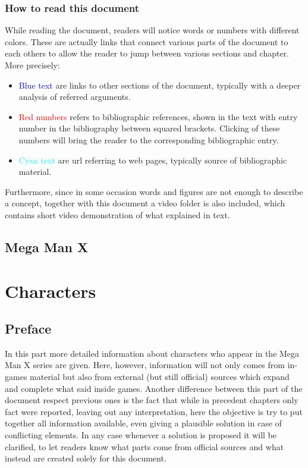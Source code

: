 \documentclass[openany]{report}
\begin{document}
	\section*{How to read this document}
	While reading the document, readers will notice words or numbers with different colors. These are actually links that connect various parts of the document to each others to allow the reader to jump between various sections and chapter. More precisely:
	\begin{itemize}
		\item \textcolor{blue}{Blue text} are links to other sections of the document, typically with a deeper analysis of referred arguments.
		\item \textcolor{red}{Red numbers} refers to bibliographic references, shown in the text with entry number in the bibliography between squared brackets. Clicking of these numbers will bring the reader to the corresponding bibliographic entry.
		\item \textcolor{cyan}{Cyan text} are url referring to web pages, typically source of bibliographic material.
	\end{itemize}
	
	Furthermore, since in some occasion words and figures are not enough to describe a concept, together with this document a video folder is also included, which contains short video demonstration of what explained in text.
	
\chapter{Mega Man X}
	

\part{Characters}
	\chapter*{Preface}
	In this part more detailed information about characters who appear in the Mega Man X series are given. Here, however, information will not only comes from in-games material but also from external (but still official) sources which expand and complete what said inside games. Another difference between this part of the document respect previous ones is the fact that while in precedent chapters only fact were reported, leaving out any interpretation, here the objective is try to put together all information available, even giving a plausible solution in case of conflicting elements. In any case whenever a solution is proposed it will be clarified, to let readers know what parts come from official sources and what instead are created solely for this document.
\end{document}
